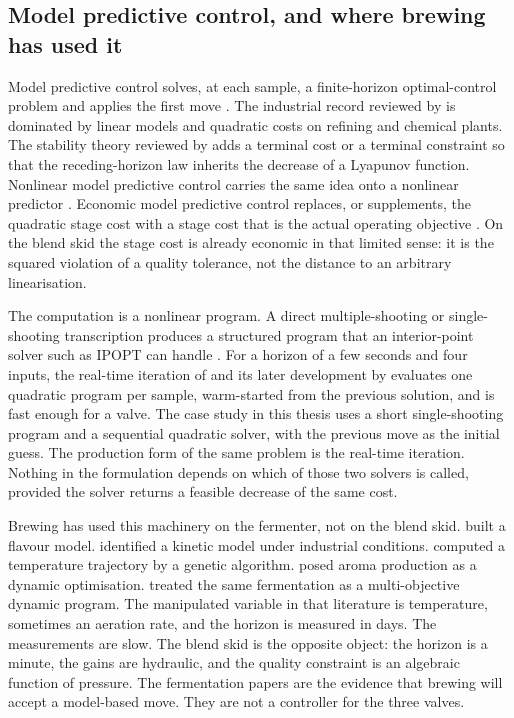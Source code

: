 \subsection{Model predictive control, and where brewing has used it}

Model predictive control solves, at each sample, a finite-horizon optimal-control problem and applies the first move \citep{garcia1989,qin2003,mayne2000,rawlings2017,camacho2007,maciejowski2002}. The industrial record reviewed by \citet{qin2003} is dominated by linear models and quadratic costs on refining and chemical plants. The stability theory reviewed by \citet{mayne2000} adds a terminal cost or a terminal constraint so that the receding-horizon law inherits the decrease of a Lyapunov function. Nonlinear model predictive control carries the same idea onto a nonlinear predictor \citep{grune2017}. Economic model predictive control replaces, or supplements, the quadratic stage cost with a stage cost that is the actual operating objective \citep{ellis2014}. On the blend skid the stage cost is already economic in that limited sense: it is the squared violation of a quality tolerance, not the distance to an arbitrary linearisation.

The computation is a nonlinear program. A direct multiple-shooting or single-shooting transcription produces a structured program that an interior-point solver such as IPOPT can handle \citep{wachter2006,andersson2019}. For a horizon of a few seconds and four inputs, the real-time iteration of \citet{diehl2005} and its later development by \citet{gros2020} evaluates one quadratic program per sample, warm-started from the previous solution, and is fast enough for a valve. The case study in this thesis uses a short single-shooting program and a sequential quadratic solver, with the previous move as the initial guess. The production form of the same problem is the real-time iteration. Nothing in the formulation depends on which of those two solvers is called, provided the solver returns a feasible decrease of the same cost.

Brewing has used this machinery on the fermenter, not on the blend skid. \citet{gee1994} built a flavour model. \citet{andrestoro1998} identified a kinetic model under industrial conditions. \citet{carrillo2001} computed a temperature trajectory by a genetic algorithm. \citet{trelea2004} posed aroma production as a dynamic optimisation. \citet{rodman2016} treated the same fermentation as a multi-objective dynamic program. The manipulated variable in that literature is temperature, sometimes an aeration rate, and the horizon is measured in days. The measurements are slow. The blend skid is the opposite object: the horizon is a minute, the gains are hydraulic, and the quality constraint is an algebraic function of pressure. The fermentation papers are the evidence that brewing will accept a model-based move. They are not a controller for the three valves.

